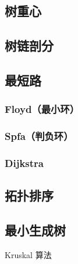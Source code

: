 \documentclass{article}
\begin{document}


\subsection{树重心}



\subsection{树链剖分}



\subsection{最短路}

\subsubsection{Floyd（最小环）}



\subsubsection{Spfa（判负环）}



\subsubsection{Dijkstra}



\subsection{拓扑排序}



\subsection{最小生成树}

Kruskal 算法


\end{document}
